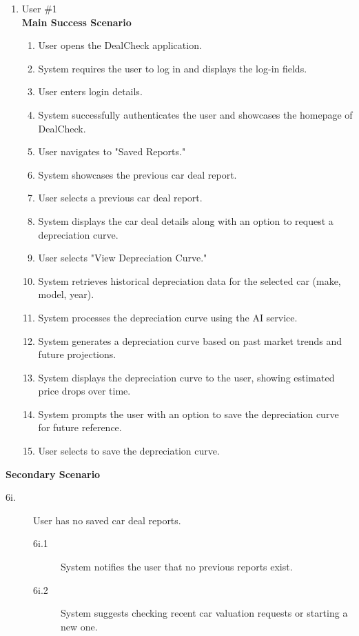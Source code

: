 \documentclass[]{article}
\begin{document}
\begin{enumerate}
\begin{enumerate}[{\bf {BE}1.}]
	\begin{enumerate}[{\bf VP1.}]
		\item User \#1 \\
		{\bf Main Success Scenario}
		\begin{enumerate}[1.]
			\item User opens the DealCheck application.
			\item System requires the user to log in and displays the log-in fields.
			\item User enters login details.
			\item System successfully authenticates the user and showcases the homepage of DealCheck.
			\item User navigates to "Saved Reports."
			\item System showcases the previous car deal report.
			\item User selects a previous car deal report.
			\item System displays the car deal details along with an option to request a depreciation curve.
			\item User selects "View Depreciation Curve."
			\item System retrieves historical depreciation data for the selected car (make, model, year).
			\item System processes the depreciation curve using the AI service.
			\item System generates a depreciation curve based on past market trends and future projections.
			\item System displays the depreciation curve to the user, showing estimated price drops over time.
			\item System prompts the user with an option to save the depreciation curve for future reference.
			\item User selects to save the depreciation curve.
		\end{enumerate}
	\end{enumerate}
		{\bf Secondary Scenario}
		\begin{description}
			\item[6i.] User has no saved car deal reports.
			\begin{description}
				\item[6i.1] System notifies the user that no previous reports exist.
				\item[6i.2] System suggests checking recent car valuation requests or starting a new one.
			\end{description}
			

\end{description}
\end{enumerate}
\end{enumerate}
\end{document}

